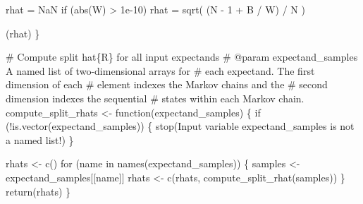 \documentclass[
  letterpaper,
  DIV=11,
  numbers=noendperiod]{scrartcl}
\newenvironment{Shaded}{\begin{snugshade}}{\end{snugshade}}
\newcommand{\BuiltInTok}[1]{\textcolor[rgb]{0.00,0.23,0.31}{#1}}
\newcommand{\CommentTok}[1]{\textcolor[rgb]{0.37,0.37,0.37}{#1}}
\newcommand{\ControlFlowTok}[1]{\textcolor[rgb]{0.00,0.23,0.31}{#1}}
\newcommand{\DecValTok}[1]{\textcolor[rgb]{0.68,0.00,0.00}{#1}}
\newcommand{\FloatTok}[1]{\textcolor[rgb]{0.68,0.00,0.00}{#1}}
\newcommand{\KeywordTok}[1]{\textcolor[rgb]{0.00,0.23,0.31}{#1}}
\newcommand{\NormalTok}[1]{\textcolor[rgb]{0.00,0.23,0.31}{#1}}
\newcommand{\OperatorTok}[1]{\textcolor[rgb]{0.37,0.37,0.37}{#1}}
\newcommand{\StringTok}[1]{\textcolor[rgb]{0.13,0.47,0.30}{#1}}
\begin{document}
\begin{Shaded}
\begin{Highlighting}[]
\NormalTok{  rhat }\OperatorTok{=}\NormalTok{ NaN}
  \ControlFlowTok{if}\NormalTok{ (}\BuiltInTok{abs}\NormalTok{(W) }\OperatorTok{\textgreater{}} \FloatTok{1e{-}10}\NormalTok{)}
\NormalTok{    rhat }\OperatorTok{=}\NormalTok{ sqrt( (N }\OperatorTok{{-}} \DecValTok{1} \OperatorTok{+}\NormalTok{ B }\OperatorTok{/}\NormalTok{ W) }\OperatorTok{/}\NormalTok{ N )}

\NormalTok{  (rhat)}
\NormalTok{\}}
\end{Highlighting}
\end{Shaded}

\begin{Shaded}
\begin{Highlighting}[]
\CommentTok{\# Compute split hat\{R\} for all input expectands}
\CommentTok{\# @param expectand\_samples A named list of two{-}dimensional arrays for }
\CommentTok{\#                          each expectand.  The first dimension of each}
\CommentTok{\#                          element indexes the Markov chains and the }
\CommentTok{\#                          second dimension indexes the sequential }
\CommentTok{\#                          states within each Markov chain.}
\NormalTok{compute\_split\_rhats }\OperatorTok{\textless{}{-}}\NormalTok{ function(expectand\_samples) \{}
  \ControlFlowTok{if}\NormalTok{ (}\OperatorTok{!}\KeywordTok{is}\NormalTok{.vector(expectand\_samples)) \{}
\NormalTok{    stop(}\StringTok{\textquotesingle{}Input variable \textasciigrave{}expectand\_samples\textasciigrave{} is not a named list!\textquotesingle{}}\NormalTok{)}
\NormalTok{  \}}

\NormalTok{  rhats }\OperatorTok{\textless{}{-}}\NormalTok{ c()}
  \ControlFlowTok{for}\NormalTok{ (name }\KeywordTok{in}\NormalTok{ names(expectand\_samples)) \{}
\NormalTok{    samples }\OperatorTok{\textless{}{-}}\NormalTok{ expectand\_samples[[name]]}
\NormalTok{    rhats }\OperatorTok{\textless{}{-}}\NormalTok{ c(rhats, compute\_split\_rhat(samples))}
\NormalTok{  \}}
  \ControlFlowTok{return}\NormalTok{(rhats)}
\NormalTok{\}}
\end{Highlighting}
\end{Shaded}
\end{document}
